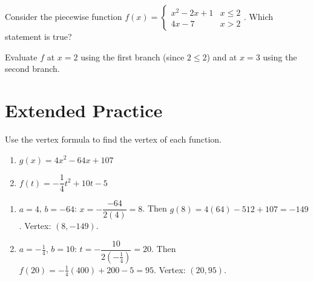 \documentclass{ximera}
\begin{document}
\begin{problem}
Consider the piecewise function $f(x) = \begin{cases} x^2-2x+1 & x \leq 2 \\ 4x-7 & x > 2 \end{cases}$. Which statement is true?
\begin{hint}
Evaluate $f$ at $x=2$ using the first branch (since $2 \leq 2$) and at $x=3$ using the second branch.
\end{hint}
\begin{multipleChoice}
\end{multipleChoice}
\end{problem}


\bigskip
\section*{Extended Practice}

\begin{problem}
Use the vertex formula to find the vertex of each function.
\begin{enumerate}
  \item[(a)] $g(x) = 4x^2 - 64x + 107$
  \medskip
  \item[(b)] $f(t) = -\dfrac{1}{4}t^2 + 10t - 5$
\end{enumerate}

\begin{solution}
\begin{enumerate}
  \item[(a)] $a=4$, $b=-64$: $x = -\dfrac{-64}{2(4)} = 8$. Then $g(8) = 4(64)-512+107 = -149$. Vertex: $(8,-149)$.

  \item[(b)] $a=-\frac{1}{4}$, $b=10$: $t = -\dfrac{10}{2(-\frac{1}{4})} = 20$. Then $f(20) = -\frac{1}{4}(400)+200-5 = 95$. Vertex: $(20,95)$.
\end{enumerate}
\end{solution}
\end{problem}
\end{document}
